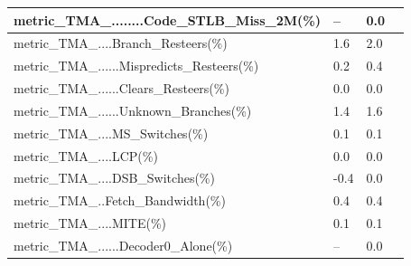 \documentclass[12pt]{article}
\begin{document}
\begin{longtable}{|b{204.20pt}|b{89.20pt}|b{89.20pt}|@{}b{0pt}@{}}
\raggedright\arraybackslash{}metric\_\allowbreak{}TMA\_\allowbreak{}........Code\_\allowbreak{}STLB\_\allowbreak{}Miss\_\allowbreak{}2M(\%) & \centering\arraybackslash{}– & \centering\arraybackslash{}0.0 & \rule[-0.00pt]{0pt}{11.65pt} \\ \hline
\cellcolor[HTML]{F8CBAD}\raggedright\arraybackslash{}metric\_\allowbreak{}TMA\_\allowbreak{}....Branch\_\allowbreak{}Resteers(\%) & \cellcolor[HTML]{F8CBAD}\centering\arraybackslash{}1.6 & \cellcolor[HTML]{F8CBAD}\centering\arraybackslash{}2.0 & \rule[-0.00pt]{0pt}{11.65pt} \\ \hline
\raggedright\arraybackslash{}metric\_\allowbreak{}TMA\_\allowbreak{}......Mispredicts\_\allowbreak{}Resteers(\%) & \centering\arraybackslash{}0.2 & \centering\arraybackslash{}0.4 & \rule[-0.00pt]{0pt}{11.65pt} \\ \hline
\raggedright\arraybackslash{}metric\_\allowbreak{}TMA\_\allowbreak{}......Clears\_\allowbreak{}Resteers(\%) & \centering\arraybackslash{}0.0 & \centering\arraybackslash{}0.0 & \rule[-0.00pt]{0pt}{11.65pt} \\ \hline
\raggedright\arraybackslash{}metric\_\allowbreak{}TMA\_\allowbreak{}......Unknown\_\allowbreak{}Branches(\%) & \centering\arraybackslash{}1.4 & \centering\arraybackslash{}1.6 & \rule[-0.00pt]{0pt}{11.65pt} \\ \hline
\raggedright\arraybackslash{}metric\_\allowbreak{}TMA\_\allowbreak{}....MS\_\allowbreak{}Switches(\%) & \centering\arraybackslash{}0.1 & \centering\arraybackslash{}0.1 & \rule[-0.00pt]{0pt}{11.65pt} \\ \hline
\raggedright\arraybackslash{}metric\_\allowbreak{}TMA\_\allowbreak{}....LCP(\%) & \centering\arraybackslash{}0.0 & \centering\arraybackslash{}0.0 & \rule[-0.00pt]{0pt}{11.65pt} \\ \hline
\raggedright\arraybackslash{}metric\_\allowbreak{}TMA\_\allowbreak{}....DSB\_\allowbreak{}Switches(\%) & \centering\arraybackslash{}-0.4 & \centering\arraybackslash{}0.0 & \rule[-0.00pt]{0pt}{11.65pt} \\ \hline
\raggedright\arraybackslash{}metric\_\allowbreak{}TMA\_\allowbreak{}..Fetch\_\allowbreak{}Bandwidth(\%) & \centering\arraybackslash{}0.4 & \centering\arraybackslash{}0.4 & \rule[-0.00pt]{0pt}{11.65pt} \\ \hline
\raggedright\arraybackslash{}metric\_\allowbreak{}TMA\_\allowbreak{}....MITE(\%) & \centering\arraybackslash{}0.1 & \centering\arraybackslash{}0.1 & \rule[-0.00pt]{0pt}{11.65pt} \\ \hline
\raggedright\arraybackslash{}metric\_\allowbreak{}TMA\_\allowbreak{}......Decoder0\_\allowbreak{}Alone(\%) & \centering\arraybackslash{}– & \centering\arraybackslash{}0.0 & \rule[-0.00pt]{0pt}{11.65pt} \\ \hline

\end{longtable}
\end{document}
